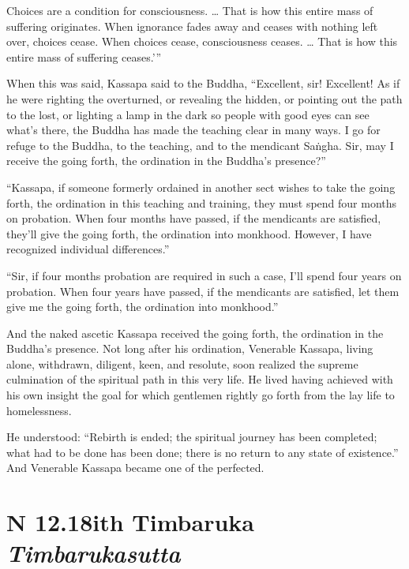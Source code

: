 \documentclass[12pt,openany]{book}%
\newcommand*{\suttatitleacronym}[1]{\smaller[2]{#1}\vspace*{.3em}}
\newcommand*{\suttatitletranslation}[1]{\linebreak{#1}}
\newcommand*{\suttatitleroot}[1]{\linebreak\smaller[2]\itshape{#1}}
\newcommand*{\tocacronym}[1]{\hspace*{-3.3em}{#1}\quad}
\newcommand*{\toctranslation}[1]{#1}
\newcommand*{\tocroot}[1]{(\textit{#1})}
\begin{document}
Choices are a condition for consciousness. … That is how this entire mass of suffering originates. When ignorance fades away and ceases with nothing left over, choices cease. When choices cease, consciousness ceases. … That is how this entire mass of suffering ceases.’” 

When this was said, Kassapa said to the Buddha, “Excellent, sir! Excellent! As if he were righting the overturned, or revealing the hidden, or pointing out the path to the lost, or lighting a lamp in the dark so people with good eyes can see what’s there, the Buddha has made the teaching clear in many ways. I go for refuge to the Buddha, to the teaching, and to the mendicant \textsanskrit{Saṅgha}. Sir, may I receive the going forth, the ordination in the Buddha’s presence?” 

“Kassapa, if someone formerly ordained in another sect wishes to take the going forth, the ordination in this teaching and training, they must spend four months on probation. When four months have passed, if the mendicants are satisfied, they’ll give the going forth, the ordination into monkhood. However, I have recognized individual differences.” 

“Sir, if four months probation are required in such a case, I’ll spend four years on probation. When four years have passed, if the mendicants are satisfied, let them give me the going forth, the ordination into monkhood.” 

And the naked ascetic Kassapa received the going forth, the ordination in the Buddha’s presence. Not long after his ordination, Venerable Kassapa, living alone, withdrawn, diligent, keen, and resolute, soon realized the supreme culmination of the spiritual path in this very life. He lived having achieved with his own insight the goal for which gentlemen rightly go forth from the lay life to homelessness. 

He understood: “Rebirth is ended; the spiritual journey has been completed; what had to be done has been done; there is no return to any state of existence.” And Venerable Kassapa became one of the perfected. 

%
\section*{{\suttatitleacronym SN 12.18}{\suttatitletranslation With Timbaruka }{\suttatitleroot Timbarukasutta}}
\addcontentsline{toc}{section}{\tocacronym{SN 12.18} \toctranslation{With Timbaruka } \tocroot{Timbarukasutta}}
\end{document}
